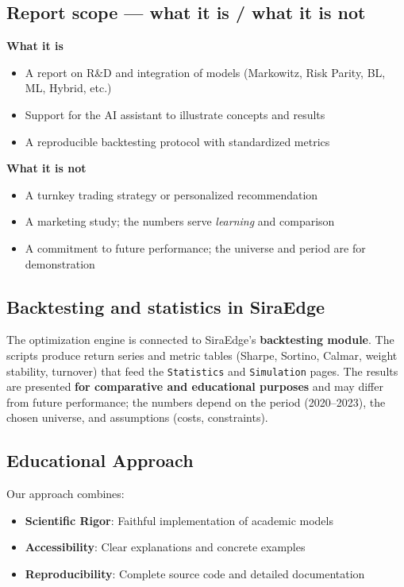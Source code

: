 \documentclass[11pt,a4paper]{article}
\begin{document}
\subsection*{Report scope — what it is / what it is not}
\textbf{What it is}
\begin{itemize}
  \item A report on R\&D and integration of models (Markowitz, Risk Parity, BL, ML, Hybrid, etc.)
  \item Support for the AI assistant to illustrate concepts and results
  \item A reproducible backtesting protocol with standardized metrics
\end{itemize}
\textbf{What it is not}
\begin{itemize}
  \item A turnkey trading strategy or personalized recommendation
  \item A marketing study; the numbers serve \emph{learning} and comparison
  \item A commitment to future performance; the universe and period are for demonstration
\end{itemize}

\subsection*{Backtesting and statistics in SiraEdge}
The optimization engine is connected to SiraEdge's \textbf{backtesting module}. The scripts produce return series and metric tables (Sharpe, Sortino, Calmar, weight stability, turnover) that feed the \texttt{Statistics} and \texttt{Simulation} pages. The results are presented \textbf{for comparative and educational purposes} and may differ from future performance; the numbers depend on the period (2020--2023), the chosen universe, and assumptions (costs, constraints).

\subsection*{Educational Approach}
Our approach combines:
\begin{itemize}
    \item \textbf{Scientific Rigor}: Faithful implementation of academic models
    \item \textbf{Accessibility}: Clear explanations and concrete examples
    \item \textbf{Reproducibility}: Complete source code and detailed documentation
\end{itemize}
\end{document}
